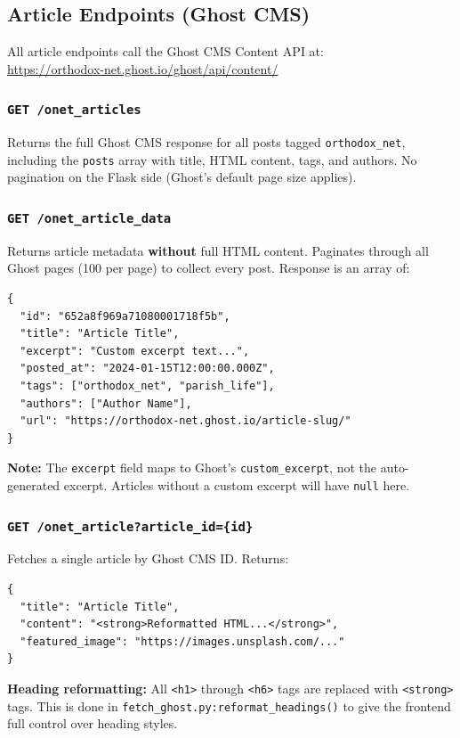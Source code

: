 \documentclass[12pt]{article}
\begin{document}
\subsection{Article Endpoints (Ghost CMS)}

All article endpoints call the Ghost CMS Content API at:\\
\url{https://orthodox-net.ghost.io/ghost/api/content/}

\subsubsection{\texttt{GET /onet\_articles}}
Returns the full Ghost CMS response for all posts tagged \texttt{orthodox\_net}, including the \texttt{posts} array with title, HTML content, tags, and authors. No pagination on the Flask side (Ghost's default page size applies).

\subsubsection{\texttt{GET /onet\_article\_data}}
Returns article metadata \textbf{without} full HTML content. Paginates through all Ghost pages (100 per page) to collect every post. Response is an array of:
\begin{lstlisting}[language={}, basicstyle=\ttfamily\footnotesize, frame=none, numbers=none]
{
  "id": "652a8f969a71080001718f5b",
  "title": "Article Title",
  "excerpt": "Custom excerpt text...",
  "posted_at": "2024-01-15T12:00:00.000Z",
  "tags": ["orthodox_net", "parish_life"],
  "authors": ["Author Name"],
  "url": "https://orthodox-net.ghost.io/article-slug/"
}
\end{lstlisting}
\textbf{Note:} The \texttt{excerpt} field maps to Ghost's \texttt{custom\_excerpt}, not the auto-generated excerpt. Articles without a custom excerpt will have \texttt{null} here.

\subsubsection{\texttt{GET /onet\_article?article\_id=\{id\}}}
Fetches a single article by Ghost CMS ID. Returns:
\begin{lstlisting}[language={}, basicstyle=\ttfamily\footnotesize, frame=none, numbers=none]
{
  "title": "Article Title",
  "content": "<strong>Reformatted HTML...</strong>",
  "featured_image": "https://images.unsplash.com/..."
}
\end{lstlisting}
\textbf{Heading reformatting:} All \texttt{<h1>} through \texttt{<h6>} tags are replaced with \texttt{<strong>} tags. This is done in \texttt{fetch\_ghost.py:reformat\_headings()} to give the frontend full control over heading styles.
\end{document}
